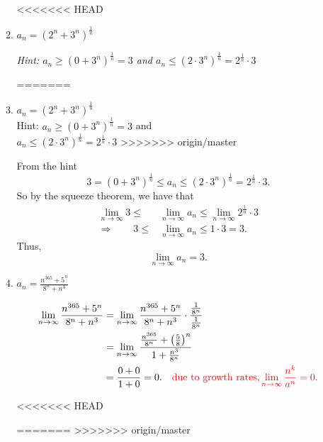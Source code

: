 \documentclass[noinstructornotes]{ximera}
\begin{document}
\begin{problem}
\begin{enumerate}
\begin{problem}
\begin{enumerate}
<<<<<<< HEAD
	\item  $a_n = (2^n + 3^n)^{\frac{1}{n}}$  
	\begin{center}
	{\it Hint:  $a_n \geq (0+3^n)^{\frac{1}{n}} = 3$ and $a_n \leq (2 \cdot 3^n)^{\frac{1}{n}} = 2^{\frac{1}{n}} \cdot 3$}
	\end{center}
=======
	\item  $a_n = (2^n + 3^n)^{\frac{1}{n}}$  \\
	Hint:  $a_n \geq (0+3^n)^{\frac{1}{n}} = 3$ and \\ $a_n \leq (2 \cdot 3^n)^{\frac{1}{n}} = 2^{\frac{1}{n}} \cdot 3$
>>>>>>> origin/master
	\begin{freeResponse}
	From the hint
		\[
		3 = (0+3^n)^\frac{1}{n}  \leq a_n \leq (2 \cdot 3^n)^\frac{1}{n} = 2^\frac{1}{n} \cdot 3.
		\]
	So by the squeeze theorem, we have that
		\begin{align*}
		\lim_{n \to \infty} 3 \leq &\lim_{n \to \infty} a_n \leq \lim_{n \to \infty} 2^\frac{1}{n} \cdot 3  \\
		\Longrightarrow 	\qquad	3 \leq &\lim_{n \to \infty} a_n \leq 1 \cdot 3 = 3.
		\end{align*}
	Thus,
		\[
		\lim_{n \to \infty} a_n = 3.
		\]
	\end{freeResponse}
	
	
	
	\item  $a_n = \frac{n^{365} + 5^n}{8^n + n^3}$
	\begin{freeResponse}
		\begin{align*}
		\lim_{n \to \infty} \frac{n^{365} + 5^n}{8^n + n^3}
		&= \lim_{n \to \infty} \frac{n^{365} + 5^n}{8^n + n^3} \cdot \frac{\frac{1}{8^n}}{\frac{1}{8^n}}  \\
		&=  \lim_{n \to \infty} \frac{\frac{n^{365}}{8^n} + \left( \frac{5}{8} \right)^n}{1 + \frac{n^3}{8^n}}  \\
		&= \frac{0+0}{1+0} = 0.		\quad	{\color{red}\text{due to growth rates,} \lim_{n \to \infty} \frac{n^k}{a^n} = 0.}
		\end{align*}
	\end{freeResponse}
	
	

<<<<<<< HEAD
	
=======
>>>>>>> origin/master
	\end{enumerate}
	

\end{problem}
\end{enumerate}
\end{problem}
\end{document}
